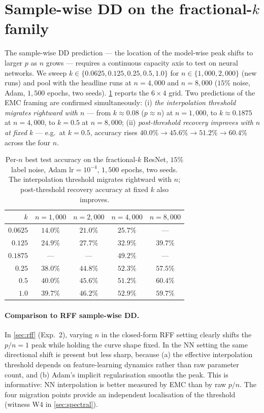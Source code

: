 \documentclass{article}
\begin{document}
\section{Sample-wise DD on the fractional-$k$ family}
\label{sec:samplewise}

The sample-wise DD prediction --- the location of the model-wise peak shifts to larger $p$ as $n$ grows --- requires a continuous capacity axis to test on neural networks. We sweep $k\in\{0.0625, 0.125, 0.25, 0.5, 1.0\}$ for $n\in\{1{,}000, 2{,}000\}$ (new runs) and pool with the headline runs at $n=4{,}000$ and $n=8{,}000$ ($15\%$ noise, Adam, $1{,}500$ epochs, two seeds). \cref{tab:samplewise} reports the $6\times 4$ grid. Two predictions of the EMC framing are confirmed simultaneously: (i) \emph{the interpolation threshold migrates rightward with $n$} --- from $k\!\approx\!0.08$ ($p\!\approx\!n$) at $n\!=\!1{,}000$, to $k\!\approx\!0.1875$ at $n\!=\!4{,}000$, to $k\!=\!0.5$ at $n\!=\!8{,}000$; (ii) \emph{post-threshold recovery improves with $n$ at fixed $k$} --- e.g.\ at $k\!=\!0.5$, accuracy rises $40.0\%\!\to\!45.6\%\!\to\!51.2\%\!\to\!60.4\%$ across the four $n$.

\begin{table}[t]
  \centering
  \small
  \caption{Per-$n$ best test accuracy on the fractional-$k$ ResNet, $15\%$ label noise, Adam $\mathrm{lr}\!=\!10^{-4}$, $1{,}500$ epochs, two seeds. The interpolation threshold migrates rightward with $n$; post-threshold recovery accuracy at fixed $k$ also improves.}
  \label{tab:samplewise}
  \begin{tabular}{rcccc}
    \toprule
    $k$ & $n=1{,}000$ & $n=2{,}000$ & $n=4{,}000$ & $n=8{,}000$ \\
    \midrule
    $0.0625$ & $14.0\%$ & $21.0\%$ & $25.7\%$ & --- \\
    $0.125$  & $24.9\%$ & $27.7\%$ & $32.9\%$ & $39.7\%$ \\
    $0.1875$ & ---      & ---      & $\mathbf{49.2\%}$ & --- \\
    $0.25$   & $38.0\%$ & $44.8\%$ & $52.3\%$ & $\mathbf{57.5\%}$ \\
    $0.5$    & $40.0\%$ & $45.6\%$ & $51.2\%$ & $\mathbf{60.4\%}$ \\
    $1.0$    & $39.7\%$ & $46.2\%$ & $52.9\%$ & $59.7\%$ \\
    \bottomrule
  \end{tabular}
\end{table}

\paragraph{Comparison to RFF sample-wise DD.} In \cref{sec:rff} (Exp.\ 2), varying $n$ in the closed-form RFF setting clearly shifts the $p/n=1$ peak while holding the curve shape fixed. In the NN setting the same directional shift is present but less sharp, because (a) the effective interpolation threshold depends on feature-learning dynamics rather than raw parameter count, and (b) Adam's implicit regularisation smooths the peak. This is informative: NN interpolation is better measured by EMC than by raw $p/n$. The four migration points provide an independent localisation of the threshold (witness W4 in \cref{sec:spectral}).
\end{document}
